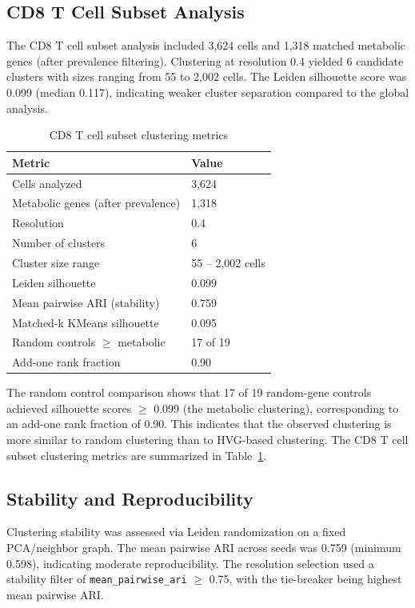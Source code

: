 \documentclass[11pt,a4paper]{article}
\begin{document}
\subsection{CD8 T Cell Subset Analysis}
The CD8 T cell subset analysis included 3,624 cells and 1,318 matched metabolic genes (after prevalence filtering). Clustering at resolution 0.4 yielded 6 candidate clusters with sizes ranging from 55 to 2,002 cells. The Leiden silhouette score was 0.099 (median 0.117), indicating weaker cluster separation compared to the global analysis.

\begin{table}[h!]
\centering
\caption{CD8 T cell subset clustering metrics}
\label{tab:cd8_metrics}
\begin{tabular}{ll}
\toprule
Metric & Value \\
\midrule
Cells analyzed & 3,624 \\
Metabolic genes (after prevalence) & 1,318 \\
Resolution & 0.4 \\
Number of clusters & 6 \\
Cluster size range & 55 -- 2,002 cells \\
Leiden silhouette & 0.099 \\
Mean pairwise ARI (stability) & 0.759 \\
Matched-k KMeans silhouette & 0.095 \\
Random controls $\ge$ metabolic & 17 of 19 \\
Add-one rank fraction & 0.90 \\
\bottomrule
\end{tabular}
\end{table}

The random control comparison shows that 17 of 19 random-gene controls achieved silhouette scores $\ge$ 0.099 (the metabolic clustering), corresponding to an add-one rank fraction of 0.90. This indicates that the observed clustering is more similar to random clustering than to HVG-based clustering. The CD8 T cell subset clustering metrics are summarized in Table~\ref{tab:cd8_metrics}.

\subsection{Stability and Reproducibility}
Clustering stability was assessed via Leiden randomization on a fixed PCA/neighbor graph. The mean pairwise ARI across seeds was 0.759 (minimum 0.598), indicating moderate reproducibility. The resolution selection used a stability filter of \texttt{mean\_pairwise\_ari} $\ge$ 0.75, with the tie-breaker being highest mean pairwise ARI.
\end{document}
